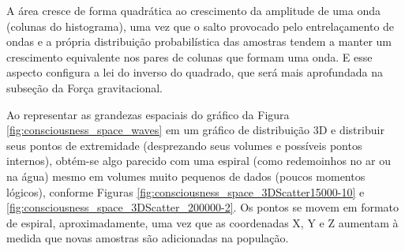 A área cresce de forma quadrática ao crescimento da amplitude de uma onda (colunas do histograma), uma vez que o salto provocado pelo entrelaçamento de ondas e a própria distribuição probabilística das amostras tendem a manter um crescimento equivalente nos pares de colunas que formam uma onda. E esse aspecto configura a lei do inverso do quadrado, que será mais aprofundada na subseção da Força gravitacional.

Ao representar as grandezas espaciais do gráfico da Figura \ref{fig:consciousness_space_waves} em um gráfico de distribuição 3D e distribuir seus pontos de extremidade (desprezando seus volumes e possíveis pontos internos), obtém-se algo parecido com uma espiral (como redemoinhos no ar ou na água) mesmo em volumes muito pequenos de dados (poucos momentos lógicos), conforme Figuras \ref{fig:consciousness_space_3DScatter15000-10} e \ref{fig:consciousness_space_3DScatter_200000-2}. Os pontos se movem em formato de espiral, aproximadamente, uma vez que as coordenadas X, Y e Z aumentam à medida que novas amostras são adicionadas na população.
